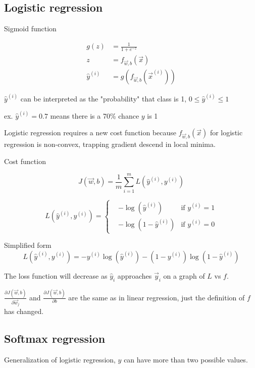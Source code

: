\documentclass[12pt]{article}
\begin{document}
\subsection{Logistic regression}

Sigmoid function

\begin{align*}
    g(z) &= \frac{1}{1 + e^{-z}}\\
    z &= f_{\vec{w},b}(\vec{x})\\
    \hat{y}^{(i)} &= g(f_{\vec{w},b}(\vec x^{(i)}))
\end{align*}

$\hat{y}^{(i)}$ can be interpreted as the "probability" that class is 1, $0 \leq \hat{y}^{(i)} \leq 1$

ex. $\hat{y}^{(i)} = 0.7$ means there is a 70\% chance $y$ is 1

Logistic regression requires a new cost function because $f_{\vec{w},b}(\vec{x})$ for logistic regression is non-convex, trapping gradient descend in local minima.

Cost function

\[ J(\vec{w},b) = \frac{1}{m} \sum_{i=1}^{m} L(\hat{y}^{(i)},y^{(i)}) \]

\begin{equation*}
L(\hat{y}^{(i)},y^{(i)}) = 
  \left\{
    \begin{aligned}
      & -\log(\hat{y}^{(i)}) & \text{if } y^{(i)} = 1 \\
      & -\log(1 - \hat{y}^{(i)}) & \text{if } y^{(i)} = 0
    \end{aligned}
  \right.
\end{equation*}

Simplified form
\[ L(\hat{y}^{(i)}, y^{(i)}) = -y^{(i)} \log(\hat{y}^{(i)}) - (1 - y^{(i)}) \log (1 - \hat{y}^{(i)}) \]

The loss function will decrease as $\hat{y}_i$ approaches $\vec{y}_i$ on a graph of $L$ vs $f$.

$\frac{\partial J(\vec{w},b)}{\partial \vec{w}_j}$ and $\frac{\partial J(\vec{w},b)}{\partial b}$ are the same as in linear regression, just the definition of $f$ has changed.

\subsection{Softmax regression}

Generalization of logistic regression, $y$ can have more than two possible values.
\end{document}
